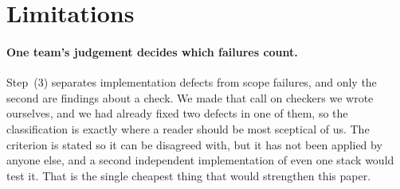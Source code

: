 \documentclass[11pt]{article}
\begin{document}
\section*{Limitations}\label{sec:limitations}
\paragraph{One team's judgement decides which failures count.} Step~(3)
separates implementation defects from scope failures, and only the second are
findings about a check. We made that call on checkers we wrote ourselves, and we
had already fixed two defects in one of them, so the classification is exactly
where a reader should be most sceptical of us. The criterion is stated so it can
be disagreed with, but it has not been applied by anyone else, and a second
independent implementation of even one stack would test it. That is the single
cheapest thing that would strengthen this paper.
\end{document}
